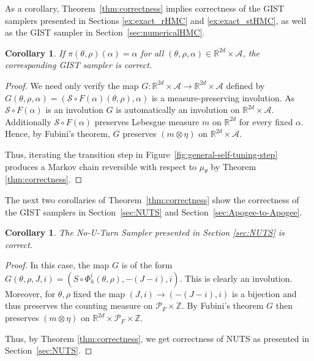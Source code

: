 \documentclass[letterpaper,11pt]{article}
\theoremstyle{plain}%
\newtheorem{theorem}[prototheorem]{Theorem}
\newtheorem{corollary}[prototheorem]{Corollary}
\theoremstyle{remark}
\begin{document}

As a corollary, Theorem~\ref{thm:correctness} implies correctness of the GIST samplers presented in Sections \ref{ex:exact_rHMC} and \ref{ex:exact_stHMC}, as well as the GIST sampler in Section~\ref{sec:numericalHMC}.

\begin{corollary}
If $\pi(\theta, \rho)(\alpha) = \alpha$ for all $(\theta, \rho, \alpha) \in \mathbb{R}^{2d} \times \mathcal{A}$, the corresponding GIST sampler is correct. 
\end{corollary}

\begin{proof}
We need only verify the map $G: \mathbb{R}^{2d} \times \mathcal{A} \to \mathbb{R}^{2d} \times \mathcal{A}$ defined by $G(\theta, \rho, \alpha) = (\mathcal{S} \circ F(\alpha)(\theta, \rho), \alpha)$ is a measure-preserving involution. As $\mathcal{S} \circ F(\alpha)$ is an involution $G$ is automatically an involution on $\mathbb{R}^{2d} \times \mathcal{A}$. Additionally $\mathcal{S} \circ F(\alpha)$ preserves Lebesgue measure $m$ on $\mathbb{R}^{2d}$ for every fixed $\alpha$.  Hence, by Fubini's theorem, $G$ preserves $(m \otimes \eta)$ on $\mathbb{R}^{2d} \times \mathcal{A}$.

Thus, iterating the transition step in Figure~\ref{fig:general-self-tuning-step} produces a Markov chain reversible with respect to $\mu_{\theta}$ by Theorem \ref{thm:correctness}.
\end{proof}

The next two corollaries of Theorem~\ref{thm:correctness} show the correctness of the GIST samplers in Section~\ref{sec:NUTS} and Section~\ref{sec:Apogee-to-Apogee}. 

\begin{corollary}
The No-U-Turn Sampler presented in Section \ref{sec:NUTS} is correct. 
\end{corollary}

\begin{proof}
In this case, the map $G$ is of the form $G(\theta, \rho, J, i) = (S \circ \Phi_h^i(\theta, \rho), -(J-i), i)$. This is clearly an involution. Moreover, for $\theta, \rho$ fixed the map $(J,i) \to (-(J-i), i)$ is a bijection and thus preserves the counting measure on $\mathcal{P}_F \times \mathbb{Z}$. By Fubini's theorem $G$ then preserves $(m \otimes \eta)$ on $\mathbb{R}^{2d} \times \mathcal{P}_F \times \mathbb{Z}$.

Thus, by Theorem \ref{thm:correctness}, we get correctness of NUTS as presented in Section~\ref{sec:NUTS}. 
\end{proof}
\end{document}
